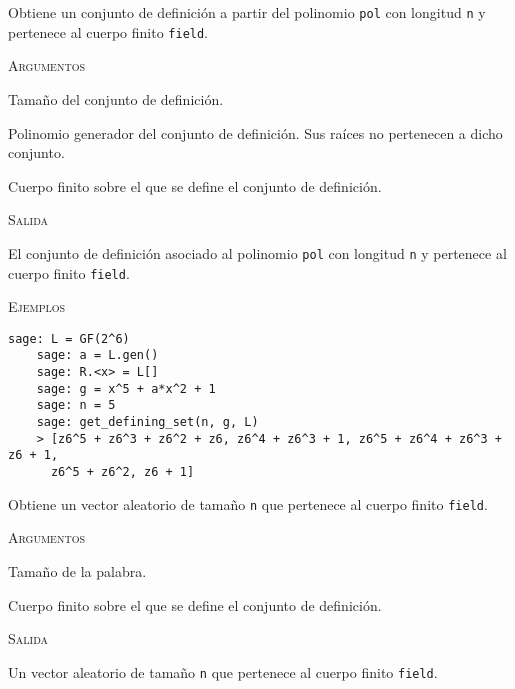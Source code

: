\begin{description}[leftmargin=1em, font=\normalfont\ttfamily, style=nextline]
  \item[get\_defining\_set(n, pol, field)] Obtiene un conjunto de definición a partir del polinomio \texttt{pol} con longitud \texttt{n} y pertenece al cuerpo finito \texttt{field}.

  \textsc{Argumentos}
  \begin{description}[font=\normalfont\ttfamily]
    \item[n] Tamaño del conjunto de definición.
    \item[pol] Polinomio generador del conjunto de definición. Sus raíces no pertenecen a dicho conjunto.
    \item[field] Cuerpo finito sobre el que se define el conjunto de definición.
  \end{description}

  \textsc{Salida}
  \begin{description}[font=\normalfont\ttfamily]
    \item[] El conjunto de definición asociado al polinomio \texttt{pol} con longitud \texttt{n} y pertenece al cuerpo finito \texttt{field}.
  \end{description}

  \textsc{Ejemplos}
  \begin{lstlisting}[gobble=4]
    sage: L = GF(2^6)
    sage: a = L.gen()
    sage: R.<x> = L[]
    sage: g = x^5 + a*x^2 + 1
    sage: n = 5
    sage: get_defining_set(n, g, L)
    > [z6^5 + z6^3 + z6^2 + z6, z6^4 + z6^3 + 1, z6^5 + z6^4 + z6^3 + z6 + 1, 
      z6^5 + z6^2, z6 + 1]
  \end{lstlisting}

  \item[random\_word(n, field)] Obtiene un vector aleatorio de tamaño \texttt{n} que pertenece al cuerpo finito \texttt{field}.

  \textsc{Argumentos}
  \begin{description}[font=\normalfont\ttfamily]
    \item[n] Tamaño de la palabra.
    \item[field] Cuerpo finito sobre el que se define el conjunto de definición.
  \end{description}

  \textsc{Salida}
  \begin{description}[font=\normalfont\ttfamily]
    \item[] Un vector aleatorio de tamaño \texttt{n} que pertenece al cuerpo finito \texttt{field}.
  \end{description}


\end{description}
